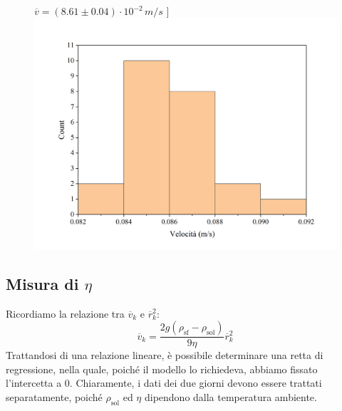 \documentclass{article}
\begin{document}
\begin{center}
\begin{figure}[H]
      $\overline{v}=(8.61\pm0.04)\cdot10^{-2}\,\unit{m\per s}$
    ]{\includegraphics[trim={1cm 0.6cm 1cm 1cm},clip,width=.49\textwidth]{img/m2.png}}
    \hfil{}
    \hfil{}
  \end{figure}
\end{center}

\pagebreak
\subsection{Misura di $\eta$}
Ricordiamo la relazione tra $\overline{v}_k$ e $\overline{r}_k^2$:
\[
  \overline{v}_k = \frac{2g(\rho_\text{sf} - \rho_\text{sol})}{9\eta}
  \overline{r}_k^2
\]
Trattandosi di una relazione lineare, è possibile determinare una
retta di regressione, nella quale, poiché il modello lo richiedeva,
abbiamo fissato l'intercetta a 0.
Chiaramente, i dati dei due giorni devono essere trattati separatamente,
poiché $\rho_\text{sol}$ ed $\eta$ dipendono dalla temperatura ambiente.
\end{document}
